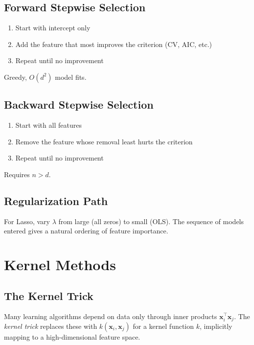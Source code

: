 \documentclass[main.tex]{subfiles}
\begin{document}
\subsection{Forward Stepwise Selection}

\begin{enumerate}
    \item Start with intercept only
    \item Add the feature that most improves the criterion (CV, AIC, etc.)
    \item Repeat until no improvement
\end{enumerate}

Greedy, $O(d^2)$ model fits.

\subsection{Backward Stepwise Selection}

\begin{enumerate}
    \item Start with all features
    \item Remove the feature whose removal least hurts the criterion
    \item Repeat until no improvement
\end{enumerate}

Requires $n > d$.

\subsection{Regularization Path}

For Lasso, vary $\lambda$ from large (all zeros) to small (OLS). The sequence of models entered gives a natural ordering of feature importance.

\needspace{0.33\textheight}
\section{Kernel Methods}

\subsection{The Kernel Trick}

Many learning algorithms depend on data only through inner products $\mathbf{x}_i^\top\mathbf{x}_j$. The \textit{kernel trick} replaces these with $k(\mathbf{x}_i, \mathbf{x}_j)$ for a kernel function $k$, implicitly mapping to a high-dimensional feature space.
\end{document}
